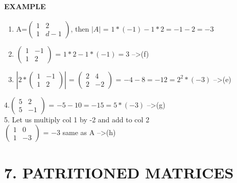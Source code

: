 \documentclass[]{article}
\let\oldparagraph\paragraph
\renewcommand{\paragraph}[1]{\oldparagraph{#1}\mbox{}}
\begin{document}
\paragraph{\texorpdfstring{EXAMPLE\\
}{EXAMPLE }}\label{example-1}

\begin{enumerate}
\def\labelenumi{\arabic{enumi}.}
\item
  A=\(\begin{pmatrix} 1 & 2 \\ 1 & d-1 \end{pmatrix}\), then \(|A|\) =
  \(1*(-1)-1*2=-1-2=-3\)\\
\item
  \(\begin{pmatrix} 1 & -1 \\ 1 & 2 \end{pmatrix}\) = \(1*2-1*(-1)=3\)
  --\textgreater{}(f)\\
\item
  \(|2*\begin{pmatrix} 1 & -1 \\ 1 & 2 \end{pmatrix}|\) =
  \(\begin{pmatrix} 2 & 4 \\ 2 & -2 \end{pmatrix}\) =
  \(-4-8=-12=2^2*(-3)\) --\textgreater{}(e)\\
\end{enumerate}

4.\(\begin{pmatrix} 5 & 2 \\ 5 & -1 \end{pmatrix}\) =
\(-5-10=-15=5*(-3)\) --\textgreater{}(g)\\[2\baselineskip] 5. Let us
multiply col 1 by -2 and add to col 2\\[2\baselineskip]
\(\begin{pmatrix} 1 & 0 \\ 1 & -3 \end{pmatrix}\) = \(-3\) same as
\textbar{}A\textbar{} --\textgreater{}(h)\\

\section{\texorpdfstring{7. PATRITIONED MATRICES\\
}{7. PATRITIONED MATRICES }}\label{patritioned-matrices}
\end{document}
